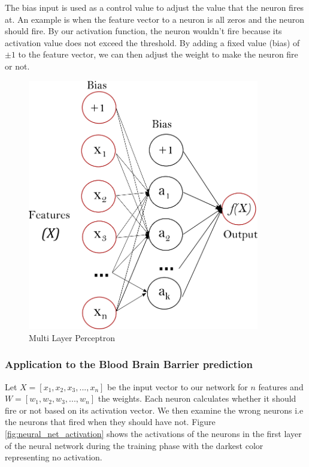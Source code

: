 \documentclass[a4paper,12pt]{report}
\begin{document}
			The bias input is used as a control value to adjust the value that the neuron fires at. An example is when the feature vector to a neuron is all zeros and the neuron should fire. By our activation function, the neuron wouldn't fire because its activation value does not exceed the threshold. By adding a fixed value (bias) of $\pm1$ to the feature vector, we can then adjust the weight to make the neuron fire or not.
				\begin{figure}[H]
					\centering
					\includegraphics[width=0.9\textwidth,scale=1,totalheight=0.5\textheight]{images/multilayerperceptronnetwork}
					\caption{Multi Layer Perceptron \cite{ScikitLearn2016}}
					\label{fig:mlp}
				\end{figure}
			\subsubsection{Application to the Blood Brain Barrier prediction}
			Let $X = [x_1,x_2,x_3,...,x_n]$ be the input vector to our network for $n$ features and $W=[w_1,w_2,w_3,...,w_n]$ the weights. Each neuron calculates whether it should fire or not based on its activation vector. We then examine the wrong neurons i.e the neurons that fired when they should have not. Figure \ref{fig:neural_net_activation} shows the activations of the neurons in the first layer of the neural network during the training phase with the darkest color representing no activation.
			
\end{document}
